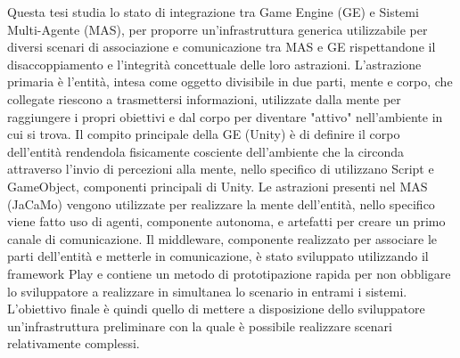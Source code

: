 Questa tesi studia lo stato di integrazione tra Game Engine (GE) e Sistemi Multi-Agente (MAS), per proporre un'infrastruttura generica utilizzabile per diversi scenari di associazione e comunicazione tra MAS e GE rispettandone il disaccoppiamento e l'integrità concettuale delle loro astrazioni. 
L’astrazione primaria è l’entità, intesa come oggetto divisibile in due parti, mente e corpo, che collegate riescono a trasmettersi informazioni, utilizzate dalla mente per raggiungere i propri obiettivi e dal corpo per diventare "attivo" nell’ambiente in cui si trova.
Il compito principale della GE (Unity) è di definire il corpo dell’entità rendendola fisicamente cosciente dell’ambiente che la circonda attraverso l’invio di percezioni alla mente, nello specifico di utilizzano Script e GameObject, componenti principali di Unity. Le astrazioni presenti nel MAS (JaCaMo) vengono utilizzate per realizzare la mente dell’entità, nello specifico viene fatto uso di agenti, componente autonoma, e artefatti per creare un primo canale di comunicazione.
Il middleware, componente realizzato per associare le parti dell’entità e metterle in comunicazione, è stato sviluppato utilizzando il framework Play e contiene un metodo di prototipazione rapida per non obbligare lo sviluppatore a realizzare in simultanea lo scenario in entrami i sistemi.
L’obiettivo finale è quindi quello di mettere a disposizione dello sviluppatore un’infrastruttura preliminare con la quale è possibile realizzare scenari relativamente complessi.